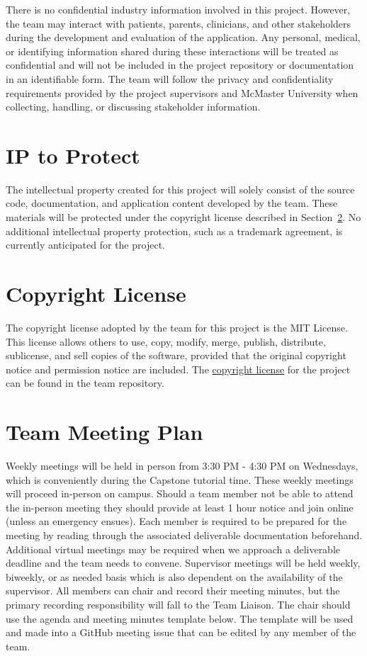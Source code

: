 \documentclass{article}
\begin{document}
There is no confidential industry information involved in this project.
However, the team may interact with patients, parents, clinicians, and other
stakeholders during the development and evaluation of the application.
Any personal, medical, or identifying information shared during these interactions
will be treated as confidential and will not be included in the project repository
or documentation in an identifiable form. The team will follow the privacy and
confidentiality requirements provided by the project supervisors and McMaster
University when collecting, handling, or discussing stakeholder information.

\section{IP to Protect}

The intellectual property created for this project will solely consist of the source code,
documentation, and application content developed by the team. These materials will be
protected under the copyright license described in Section~\ref{sec:copyright-license}.
No additional intellectual property protection, such as a trademark agreement, is
currently anticipated for the project.

\section{Copyright License}
\label{sec:copyright-license}

The copyright license adopted by the team for this project is the MIT License.
This license allows others to use, copy, modify, merge, publish, distribute, sublicense,
and sell copies of the software, provided that the original copyright notice and permission
notice are included. The \href{https://github.com/team-hindsight/ophthamology-game/blob/main/LICENSE}{copyright license}
for the project can be found in the team repository.

\section{Team Meeting Plan}

Weekly meetings will be held in person from 3:30 PM - 4:30 PM on Wednesdays, which 
is conveniently during the Capstone tutorial time. These weekly meetings will 
proceed in-person on campus. Should a 
team member not be able to attend the in-person meeting they should provide at least 
1 hour notice and join online (unless an emergency ensues). Each member is required 
to be prepared for the meeting by reading through the associated deliverable 
documentation beforehand. Additional virtual meetings may be required when we approach 
a deliverable deadline and the team needs to convene. Supervisor meetings will be 
held weekly, biweekly, or as needed basis which is also dependent on the availability 
of the supervisor. All members can chair and record their meeting minutes, but the 
primary recording responsibility will fall to the Team Liaison. The chair should use 
the agenda and meeting minutes template below. The template will be used and made into 
a GitHub meeting issue that can be edited by any member of the team.
\end{document}

